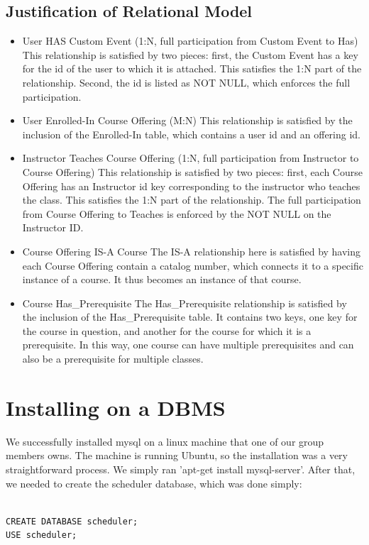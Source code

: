 \documentclass[pdftex,12pt,letter]{article}
\begin{document}
\subsection{Justification of Relational Model}
\begin{itemize}
\item User HAS Custom Event (1:N, full participation from Custom Event to Has)
\subitem This relationship is satisfied by two pieces: first, the Custom Event has a key for the id of the user to which it is attached. This satisfies the 1:N part of the relationship. Second, the id is listed as NOT NULL, which enforces the full participation.
\item User Enrolled-In Course Offering (M:N)
\subitem This relationship is satisfied by the inclusion of the Enrolled-In table, which contains a user id and an offering id.
\item Instructor Teaches Course Offering (1:N, full participation from Instructor to Course Offering)
\subitem This relationship is satisfied by two pieces: first, each Course Offering has an Instructor id key corresponding to the instructor who teaches the class. This satisfies the 1:N part of the relationship. The full participation from Course Offering to Teaches is enforced by the NOT NULL on the Instructor ID.
\item Course Offering IS-A Course
\subitem The IS-A relationship here is satisfied by having each Course Offering contain a catalog number, which connects it to a specific instance of a course. It thus becomes an instance of that course.
\item Course Has\_Prerequisite
\subitem The Has\_Prerequisite relationship is satisfied by the inclusion of the Has\_Prerequisite table. It contains two keys, one key for the course in question, and another for the course for which it is a prerequisite. In this way, one course can have multiple prerequisites and can also be a prerequisite for multiple classes.
\end{itemize}
\section{Installing on a DBMS}
We successfully installed mysql on a linux machine that one of our group members owns.  The machine is running Ubuntu, so the installation was a very straightforward process.  We simply ran 'apt-get install mysql-server'.  After that, we needed to create the scheduler database, which was done simply:\\\\
\begin{verbatim}
CREATE DATABASE scheduler;
USE scheduler;
\end{verbatim}
\end{document}
